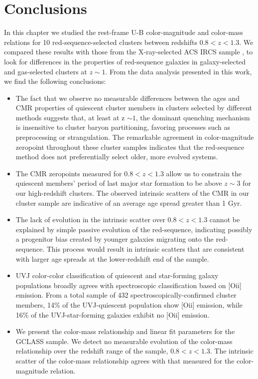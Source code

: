\section{Conclusions}\label{conclusions}

In this chapter we studied the rest-frame U-B color-magnitude and color-mass relations for 10 red-sequence-selected clusters between redshifts $0.8 < z < 1.3$.
We compared these results with those from the X-ray-selected ACS IRCS sample \citep{Mei:2009wt}, to look for differences in the properties of red-sequence galaxies in galaxy-selected and gas-selected clusters at $z \sim 1$.
From the data analysis presented in this work, we find the following conclusions:

\begin{itemize}

\item
The fact that we observe no measurable differences between the ages and CMR properties of quiescent cluster members in clusters selected by different methods suggests that, at least at z $\sim 1$, the dominant quenching mechanism is insensitive to cluster baryon partitioning, favoring processes such as preprocessing or strangulation.
The remarkable agreement in color-magnitude zeropoint throughout these cluster samples indicates that the red-sequence method does not preferentially select older, more evolved systems.

\item
The CMR zeropoints measured for $0.8 < z < 1.3$ allow us to constrain the quiescent members' period of last major star formation to be above $z \sim 3$ for our high-redshift clusters. The observed intrinsic scatters of the CMR in our cluster sample are indicative of an average age spread greater than 1 Gyr.

\item The lack of evolution in the intrinsic scatter over $0.8 < z < 1.3$ cannot be explained by simple passive evolution of the red-sequence, indicating possibly a progenitor bias created by younger galaxies migrating onto the red-sequence. This process would result in intrinsic scatters that are consistent with larger age spreads at the lower-redshift end of the sample.

\item UVJ color-color classification of quiescent and star-forming galaxy populations broadly agrees with spectroscopic classification based on [O{\sc ii}] emission. From a total sample of 432 spectroscopically-confirmed cluster members, 14\% of the UVJ-quiescent population show [O{\sc ii}] emission, while 16\% of the UVJ-star-forming galaxies exhibit no [O{\sc ii}] emission.

\item We present the color-mass relationship and linear fit parameters for the GCLASS sample. We detect no measurable evolution of the color-mass relationship over the redshift range of the sample, $0.8 < z < 1.3$. The intrinsic scatter of the color-mass relationship agrees with that measured for the color-magnitude relation.

\end{itemize}

